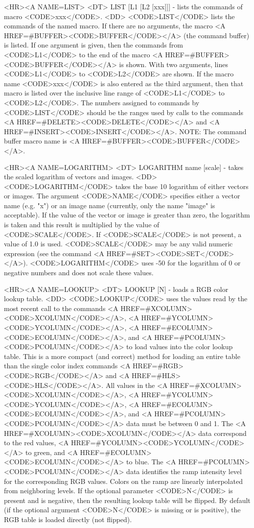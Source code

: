 \begin{rawhtml}
<HR><A NAME=LIST>
<DT>
LIST [L1 [L2 [xxx]]] - lists the commands of macro <CODE>xxx</CODE>.
<DD>
	<CODE>LIST</CODE> lists the commands of the named macro.  If there
	are no arguments, the macro <A HREF=#BUFFER><CODE>BUFFER</CODE></A>
	(the command buffer) is listed.  If one argument is given, then
	the commands from <CODE>L1</CODE> to the end of the macro
	<A HREF=#BUFFER><CODE>BUFFER</CODE></A> is shown.  With two
	arguments, lines <CODE>L1</CODE> to <CODE>L2</CODE> are shown.
	If the macro name <CODE>xxx</CODE> is also entered as the third
	argument, then that macro is listed over the inclusive line range
	of <CODE>L1</CODE> to <CODE>L2</CODE>.  The numbers assigned to
	commands by <CODE>LIST</CODE> should be the ranges used by calls
	to the commands <A HREF=#DELETE><CODE>DELETE</CODE></A> and
	<A HREF=#INSERT><CODE>INSERT</CODE></A>.
	NOTE: The command buffer macro name is
	<A HREF=#BUFFER><CODE>BUFFER</CODE></A>.

<HR><A NAME=LOGARITHM>
<DT>
LOGARITHM name [scale] - takes the scaled logarithm of vectors and images.
<DD>
	<CODE>LOGARITHM</CODE> takes the base 10 logarithm of either
	vectors or images.  The argument <CODE>NAME</CODE> specifies
	either a vector name (e.g. "x") or an image name (currently,
	only the name "image" is acceptable).  If the value of the
	vector or image is greater than zero, the logarithm is taken
	and this result is multiplied by the value of <CODE>SCALE</CODE>.
	If <CODE>SCALE</CODE> is not present, a value of 1.0 is used.
	<CODE>SCALE</CODE> may be any valid numeric expression (see
	the command <A HREF=#SET><CODE>SET</CODE></A>).
	<CODE>LOGARITHM</CODE> uses -50 for the logarithm
	of 0 or negative numbers and does not scale these values.

<HR><A NAME=LOOKUP>
<DT>
LOOKUP [N] - loads a RGB color lookup table.
<DD>
	<CODE>LOOKUP</CODE> uses the values read by the most recent call to
	the commands <A HREF=#XCOLUMN><CODE>XCOLUMN</CODE></A>,
	<A HREF=#YCOLUMN><CODE>YCOLUMN</CODE></A>,
	<A HREF=#ECOLUMN><CODE>ECOLUMN</CODE></A>, and
	<A HREF=#PCOLUMN><CODE>PCOLUMN</CODE></A>
	to load values into the color lookup table.  This is a more
	compact (and correct) method for loading an entire table than
	the single color index commands <A HREF=#RGB><CODE>RGB</CODE></A> and
	<A HREF=#HLS><CODE>HLS</CODE></A>.  All values in the
	<A HREF=#XCOLUMN><CODE>XCOLUMN</CODE></A>,
	<A HREF=#YCOLUMN><CODE>YCOLUMN</CODE></A>,
	<A HREF=#ECOLUMN><CODE>ECOLUMN</CODE></A>, and
	<A HREF=#PCOLUMN><CODE>PCOLUMN</CODE></A> data must be between 0 and 1.
	The <A HREF=#XCOLUMN><CODE>XCOLUMN</CODE></A> data correspond to the
	red values, <A HREF=#YCOLUMN><CODE>YCOLUMN</CODE></A> to green, and
	<A HREF=#ECOLUMN><CODE>ECOLUMN</CODE></A> to blue.  The
	<A HREF=#PCOLUMN><CODE>PCOLUMN</CODE></A> data identifies the
	ramp intensity level for the corresponding RGB values.  Colors
	on the ramp are linearly interpolated from neighboring levels.
	If the optional parameter <CODE>N</CODE> is present and is negative,
	then the resulting lookup table will be flipped.  By default (if the
	optional argument <CODE>N</CODE> is missing or is positive), the
	RGB table is loaded directly (not flipped).


\end{rawhtml}
